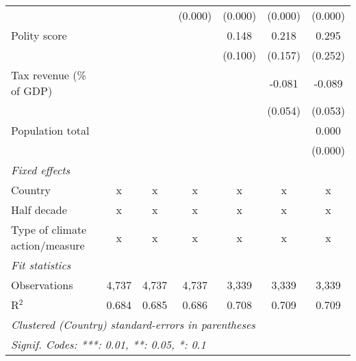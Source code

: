 \begin{tabular}{lcccccc}
                                                                                        &         &               & (0.000)        & (0.000)        & (0.000)        & (0.000)\\   
   Polity score                                                                         &         &               &                & 0.148          & 0.218          & 0.295\\   
                                                                                        &         &               &                & (0.100)        & (0.157)        & (0.252)\\   
   Tax revenue (\% of GDP)                                                              &         &               &                &                & -0.081         & -0.089\\   
                                                                                        &         &               &                &                & (0.054)        & (0.053)\\   
   Population total                                                                     &         &               &                &                &                & 0.000\\   
                                                                                        &         &               &                &                &                & (0.000)\\   
   \emph{Fixed effects}\\
   Country                                                                              & x       & x             & x              & x              & x              & x\\  
   Half decade                                                                          & x       & x             & x              & x              & x              & x\\  
   Type of climate action/measure                                                       & x       & x             & x              & x              & x              & x\\  
   \midrule \emph{Fit statistics}\\
   Observations                                                                         & 4,737   & 4,737         & 4,737          & 3,339          & 3,339          & 3,339\\  
   R$^2$                                                                                & 0.684   & 0.685         & 0.686          & 0.708          & 0.709          & 0.709\\  
   \midrule
   \multicolumn{7}{l}{\emph{Clustered (Country) standard-errors in parentheses}}\\
   \multicolumn{7}{l}{\emph{Signif. Codes: ***: 0.01, **: 0.05, *: 0.1}}\\
\end{tabular}
\par\endgroup


